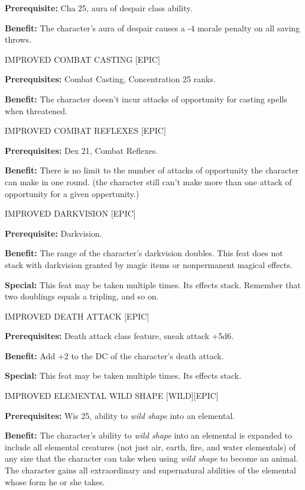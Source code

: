 \documentclass{article}
\begin{document}
\textbf{Prerequisite:} Cha 25, aura of despair class ability. 

\textbf{Benefit:} The character's aura of despair causes a -4 morale penalty on 
all saving throws. 

\vspace{12pt}
IMPROVED COMBAT CASTING [EPIC] 

\textbf{Prerequisites:} Combat Casting, Concentration 25 ranks. 

\textbf{Benefit:} The character doesn't incur attacks of opportunity for casting 
spells when threatened. 

\vspace{12pt}
IMPROVED COMBAT REFLEXES [EPIC] 

\textbf{Prerequisites:} Dex 21, Combat Reflexes. 

\textbf{Benefit:} There is no limit to the number of attacks of opportunity the 
character can make in one round. (the character still can't make more than one 
attack of opportunity for a given oppertunity.) 

\vspace{12pt}
IMPROVED DARKVISION [EPIC]

\textbf{Prerequisite:} Darkvision. 

\textbf{Benefit:} The range of the character's darkvision doubles. This feat does 
not stack with darkvision granted by magic items or nonpermanent magical effects. 

\textbf{Special:} This feat may be taken multiple times. Its effects stack. Remember 
that two doublings equals a tripling, and so on. 

\vspace{12pt}
IMPROVED DEATH ATTACK [EPIC] 

\textbf{Prerequisites:} Death attack class feature, sneak attack +5d6. 

\textbf{Benefit:} Add +2 to the DC of the character's death attack. 

\textbf{Special:} This feat may be taken multiple times. Its effects stack. 

\vspace{12pt}
IMPROVED ELEMENTAL WILD SHAPE [WILD][EPIC] 

\textbf{Prerequisites:} Wis 25, ability to \textit{wild shape }into an elemental. 

\textbf{Benefit:} The character's ability to \textit{wild shape }into an elemental 
is expanded to include all elemental creatures (not just air, earth, fire, and 
water elementals) of any size that the character can take when using \textit{wild 
shape }to become an animal. The character gains all extraordinary and supernatural 
abilities of the elemental whose form he or she takes. 
\end{document}
